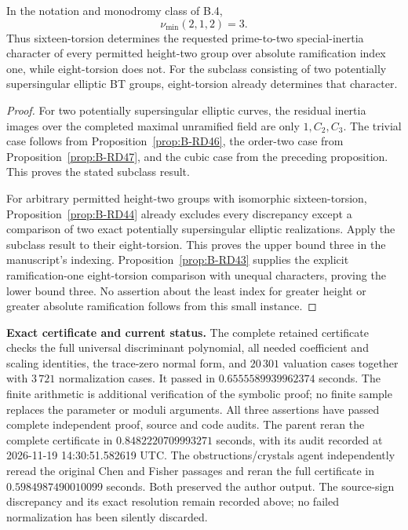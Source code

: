 \begin{theorem}
\label{thm:B-RD48}
In the notation and monodromy class of B.4,
\[
                            \nu_{\min}(2,1,2)=3.
\]
Thus sixteen-torsion determines the requested prime-to-two
special-inertia character of every permitted height-two group
over absolute ramification index one, while eight-torsion does not.
For the subclass consisting of two potentially supersingular
elliptic BT groups, eight-torsion already determines that character.
\end{theorem}
\begin{proof}
For two potentially supersingular elliptic curves, the residual
inertia images over the completed maximal unramified field are
only $1,C_2,C_3$. The trivial case follows from
Proposition~\ref{prop:B-RD46}, the order-two case from
Proposition~\ref{prop:B-RD47}, and the cubic case from the
preceding proposition. This proves the stated subclass result.

For arbitrary permitted height-two groups with isomorphic
sixteen-torsion, Proposition~\ref{prop:B-RD44} already excludes
every discrepancy except a comparison of two exact potentially
supersingular elliptic realizations. Apply the subclass result
to their eight-torsion. This proves the upper bound three in
the manuscript's indexing. Proposition~\ref{prop:B-RD43}
supplies the explicit ramification-one eight-torsion comparison
with unequal characters, proving the lower bound three.
No assertion about the least index for greater height or
greater absolute ramification follows from this small instance.
\end{proof}

\par\smallskip\noindent\textbf{Exact certificate and current status.}
The complete retained certificate
checks the full universal discriminant polynomial, all needed
coefficient and scaling identities, the trace-zero normal form,
and $20\,301$ valuation cases together with $3\,721$ normalization
cases. It passed in $0.6555589939962374$ seconds.
The finite arithmetic is additional verification of the symbolic
proof; no finite sample replaces the parameter or moduli arguments.
All three assertions have passed complete independent proof,
source and code audits. The parent reran the complete certificate
in $0.8482220709993271$ seconds, with its audit recorded at
2026-11-19 14:30:51.582619 UTC. The obstructions/crystals agent
independently reread the original Chen and Fisher passages and
reran the full certificate in $0.5984987490010099$ seconds.
Both preserved the author output. The source-sign discrepancy
and its exact resolution remain recorded above; no failed
normalization has been silently discarded.


